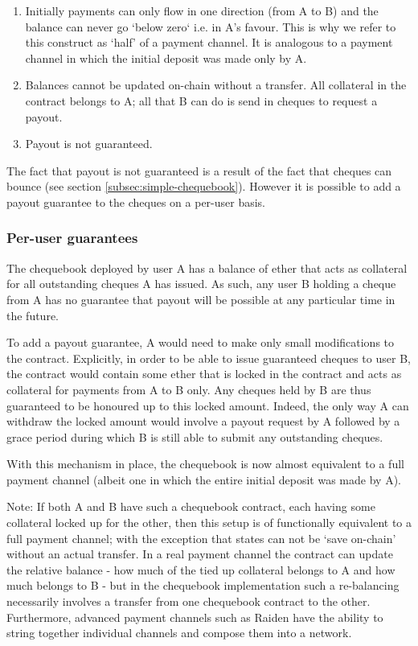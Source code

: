 \begin{enumerate}
    \item Initially payments can only flow in one direction (from A to B) and the balance can never go `below zero` i.e. in A's favour. This is why we refer to this construct as `half' of a payment channel. It is analogous to a payment channel in which the initial deposit was made only by A.
    \item Balances cannot be updated on-chain without a transfer. All collateral in the contract belongs to A; all that B can do is send in cheques to request a payout.
    \item Payout is not guaranteed. 
\end{enumerate}

The fact that payout is not guaranteed is a result of the fact that cheques can bounce (see section \ref{subsec:simple-chequebook}). However it is possible to add a payout guarantee to the cheques on a per-user basis.

\subsubsection{Per-user guarantees}\label{subsubsec:per-user-guarantees}

The chequebook deployed by user A has a balance of ether that acts as collateral for all outstanding cheques A has issued. As such, any user B holding a cheque from A has no guarantee that payout will be possible at any particular time in the future. 

To add a payout guarantee, A would need to make only small modifications to the contract. Explicitly, in order to be able to issue guaranteed cheques to user B, the contract would contain some ether that is locked in the contract and acts as collateral for payments from A to B only. Any cheques held by B are thus guaranteed to be honoured up to this locked amount. Indeed, the only way A can withdraw the locked amount would involve a payout request by A followed by a grace period during which B is still able to submit any outstanding cheques.

With this mechanism in place, the chequebook is now almost equivalent to a full payment channel (albeit one in which the entire initial deposit was made by A).

Note: If both A and B have such a chequebook contract, each having some collateral locked up for the other, then this setup is of functionally equivalent to a full payment channel; with the exception that states can not be `save on-chain' without an actual transfer. In a real payment channel the contract can update the relative balance - how much of the tied up collateral belongs to A and how much belongs to B - but in the chequebook implementation such a re-balancing necessarily involves a transfer from one chequebook contract to the other. Furthermore, advanced payment channels such as Raiden \cite{citation-needed:Raiden} have the ability to string together individual channels and compose them into a network.


